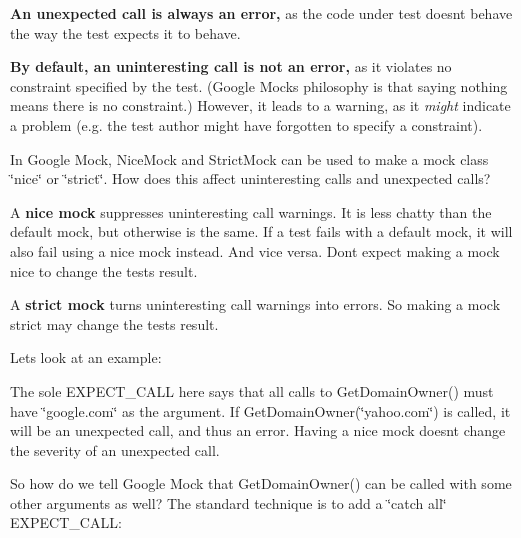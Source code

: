 {\bfseries An unexpected call is always an error,} as the code under test doesn\textquotesingle{}t behave the way the test expects it to behave.

{\bfseries By default, an uninteresting call is not an error,} as it violates no constraint specified by the test. (Google Mock\textquotesingle{}s philosophy is that saying nothing means there is no constraint.) However, it leads to a warning, as it {\itshape might} indicate a problem (e.\+g. the test author might have forgotten to specify a constraint).

In Google Mock, {\ttfamily Nice\+Mock} and {\ttfamily Strict\+Mock} can be used to make a mock class \char`\"{}nice\char`\"{} or \char`\"{}strict\char`\"{}. How does this affect uninteresting calls and unexpected calls?

A {\bfseries nice mock} suppresses uninteresting call warnings. It is less chatty than the default mock, but otherwise is the same. If a test fails with a default mock, it will also fail using a nice mock instead. And vice versa. Don\textquotesingle{}t expect making a mock nice to change the test\textquotesingle{}s result.

A {\bfseries strict mock} turns uninteresting call warnings into errors. So making a mock strict may change the test\textquotesingle{}s result.

Let\textquotesingle{}s look at an example\+:


\begin{DoxyCode}{0}
\DoxyCodeLine{}
\DoxyCodeLine{\}}
\end{DoxyCode}


The sole {\ttfamily E\+X\+P\+E\+C\+T\+\_\+\+C\+A\+LL} here says that all calls to {\ttfamily Get\+Domain\+Owner()} must have {\ttfamily \char`\"{}google.\+com\char`\"{}} as the argument. If {\ttfamily Get\+Domain\+Owner(\char`\"{}yahoo.\+com\char`\"{})} is called, it will be an unexpected call, and thus an error. Having a nice mock doesn\textquotesingle{}t change the severity of an unexpected call.

So how do we tell Google Mock that {\ttfamily Get\+Domain\+Owner()} can be called with some other arguments as well? The standard technique is to add a \char`\"{}catch all\char`\"{} {\ttfamily E\+X\+P\+E\+C\+T\+\_\+\+C\+A\+LL}\+:


